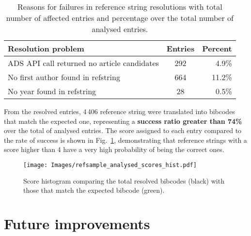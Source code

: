 \documentclass[a4paper,10pt,twoside]{article}
\begin{document}
\begin{table}[H]
    \begin{centering}
        \begin{center}
            \begin{tabular}{l|c|r}
            \scriptsize{\textbf{Resolution problem}} & \scriptsize{\textbf{Entries}} & \scriptsize{\textbf{Percent}} \\
            \hline
			ADS API call returned no article candidates &   292  &   4.9\% \\
			No first author found in refstring          &   664  &  11.2\% \\
			No year found in refstring                  &    28  &   0.5\% \\
            \end{tabular}
        \end{center}

        \par
    \end{centering}
    \caption{Reasons for failures in reference string resolutions with total number of affected entries and percentage over the total number of analysed entries.}
    \label{tab:not_resolved}
\end{table}

From the resolved entries, 4\,406 reference string were translated into bibcodes that match the expected one, representing a \textbf{success ratio greater than 74\%} over the total of analysed entries. The score assigned to each entry compared to the rate of success is shown in Fig.~\ref{fig:score_histogram}, demonstrating that reference strings with a score higher than 4 have a very high probability of being the correct ones.

\begin{figure}[H]
    \begin{centering}
        \texttt{[image: Images/refsample\_analysed\_scores\_hist.pdf]}
        \par
    \end{centering}
    \caption{Score histogram comparing the total resolved bibcodes (black) with those that match the expected bibcode (green).}
	\label{fig:score_histogram}
\end{figure}




\section{Future improvements}
\end{document}
